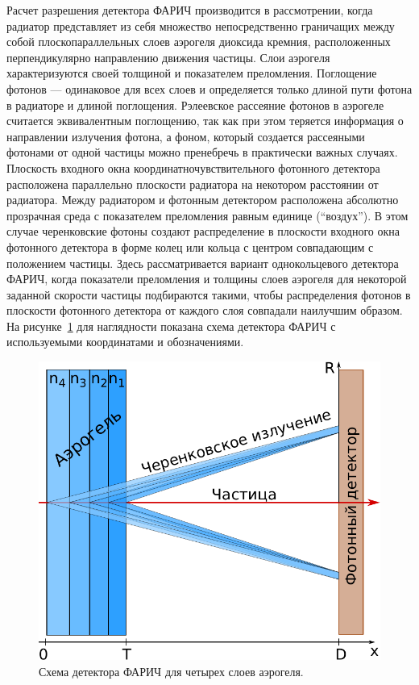 \documentclass[12pt]{article}
\begin{document}
Расчет разрешения детектора ФАРИЧ производится в рассмотрении, когда радиатор представляет из себя множество непосредственно граничащих между 
собой плоскопараллельных слоев аэрогеля диоксида кремния, расположенных перпендикулярно направлению движения частицы. Слои аэрогеля характеризуются своей 
толщиной и показателем преломления. Поглощение фотонов --- одинаковое для всех слоев и определяется только длиной пути фотона в радиаторе и длиной поглощения. 
Рэлеевское рассеяние фотонов в аэрогеле считается эквивалентным поглощению, 
так как при этом теряется информация о направлении излучения фотона, а фоном, который создается рассеяными фотонами от одной частицы можно пренебречь в практически важных случаях. 
Плоскость входного окна координатночувствительного фотонного детектора расположена параллельно плоскости радиатора на некотором расстоянии от радиатора. 
Между радиатором и фотонным детектором расположена абсолютно прозрачная среда с показателем преломления равным единице (``воздух''). 
В этом случае черенковские фотоны создают распределение в плоскости входного окна фотонного детектора в форме колец или кольца с центром 
совпадающим с положением частицы. Здесь рассматривается вариант однокольцевого детектора ФАРИЧ, когда показатели преломления и толщины 
слоев аэрогеля для некоторой заданной скорости частицы подбираются такими, чтобы распределения фотонов в плоскости фотонного детектора от каждого слоя совпадали наилучшим образом.
На рисунке~\ref{fig:farich} для наглядности показана схема детектора ФАРИЧ с используемыми координатами и обозначениями.

\begin{figure}[htb]
\begin{center}
\includegraphics[width=0.4\textheight]{farich_scheme.pdf}
\caption{\small Схема детектора ФАРИЧ для четырех слоев аэрогеля.}
\label{fig:farich}
\end{center}
\end{figure}
\end{document}
